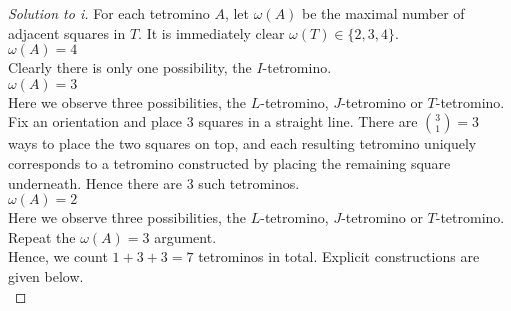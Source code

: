 \documentclass[11pt]{article}
\theoremstyle{definition}
\begin{document}
\begin{proof}[Solution to i]
For each tetromino $A$, let $\omega(A)$ be the maximal number of adjacent squares in $T$. It is immediately clear 
$\omega(T) \in \{2,3,4\}$. \\

\underline{$\omega(A) = 4$} \\
Clearly there is only one possibility, the $I$-tetromino. \\

\underline{$\omega(A) = 3$} \\ 
Here we observe three possibilities, the $L$-tetromino, $J$-tetromino or $T$-tetromino. Fix an orientation and 
place $3$ squares in a straight line. There are $\binom{3}{1} = 3$ ways to place the two squares on top, and each 
resulting tetromino uniquely corresponds to a tetromino constructed by placing the remaining square underneath. Hence 
there are $3$ such tetrominos. \\

\underline{$\omega(A) = 2$} \\
Here we observe three possibilities, the $L$-tetromino, $J$-tetromino or $T$-tetromino. Repeat the $\omega(A) = 3$ 
argument. \\

Hence, we count $1 + 3 + 3 = 7$  tetrominos in total. Explicit constructions are given below. \\


\end{proof}
\end{document}

